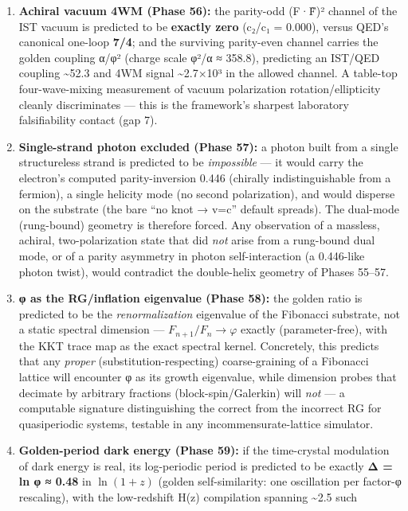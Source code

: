 \documentclass[
]{article}
\begin{document}
\begin{enumerate}
  discriminator.
\item
  \textbf{Achiral vacuum 4WM (Phase 56):} the parity-odd (F·F̃)² channel
  of the IST vacuum is predicted to be \textbf{exactly zero} (c₂/c₁ =
  0.000), versus QED's canonical one-loop \textbf{7/4}; and the
  surviving parity-even channel carries the golden coupling α/φ² (charge
  scale φ²/α ≈ 358.8), predicting an IST/QED coupling
  \textasciitilde52.3 and 4WM signal \textasciitilde2.7×10³ in the
  allowed channel. A table-top four-wave-mixing measurement of vacuum
  polarization rotation/ellipticity cleanly discriminates --- this is
  the framework's sharpest laboratory falsifiability contact (gap 7).
\item
  \textbf{Single-strand photon excluded (Phase 57):} a photon built from
  a single structureless strand is predicted to be \emph{impossible} ---
  it would carry the electron's computed parity-inversion 0.446
  (chirally indistinguishable from a fermion), a single helicity mode
  (no second polarization), and would disperse on the substrate (the
  bare ``no knot → v=c'' default spreads). The dual-mode (rung-bound)
  geometry is therefore forced. Any observation of a massless, achiral,
  two-polarization state that did \emph{not} arise from a rung-bound
  dual mode, or of a parity asymmetry in photon self-interaction (a
  0.446-like photon twist), would contradict the double-helix geometry
  of Phases 55--57.
\item
  \textbf{φ as the RG/inflation eigenvalue (Phase 58):} the golden ratio
  is predicted to be the \emph{renormalization} eigenvalue of the
  Fibonacci substrate, not a static spectral dimension ---
  \(F_{n+1}/F_n \to \varphi\) exactly (parameter-free), with the KKT
  trace map as the exact spectral kernel. Concretely, this predicts that
  any \emph{proper} (substitution-respecting) coarse-graining of a
  Fibonacci lattice will encounter φ as its growth eigenvalue, while
  dimension probes that decimate by arbitrary fractions
  (block-spin/Galerkin) will \emph{not} --- a computable signature
  distinguishing the correct from the incorrect RG for quasiperiodic
  systems, testable in any incommensurate-lattice simulator.
\item
  \textbf{Golden-period dark energy (Phase 59):} if the time-crystal
  modulation of dark energy is real, its log-periodic period is
  predicted to be exactly \textbf{Δ = ln φ ≈ 0.48} in \(\ln(1+z)\)
  (golden self-similarity: one oscillation per factor-φ rescaling), with
  the low-redshift H(z) compilation spanning \textasciitilde2.5 such

\end{enumerate}
\end{document}
